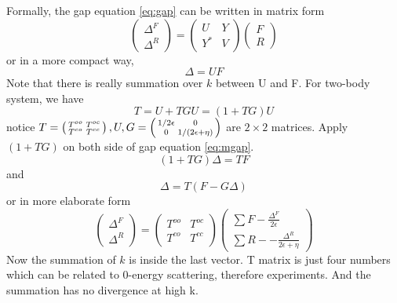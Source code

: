 Formally, the gap equation \eqref{eq:gap} can be written in matrix form
\begin{equation}\label{eq:gapMatrix}
\begin{pmatrix}\Delta^F\\\Delta^R\end{pmatrix}=\begin{pmatrix}U&Y\\Y^*&V\end{pmatrix}\begin{pmatrix}F\\R\end{pmatrix}
\end{equation}
 or in a more compact way, 
\begin{equation}\label{eq:mgap}\Delta=UF\end{equation}
Note that there is really summation over $k$ between U and F.
For two-body system, we have 
\begin{equation}\label{eq:TU}T=U+TGU=(1+TG)U\end{equation}
notice $T=\left(\begin{smallmatrix}T^{oo}&T^{oc}\\T^{co}&T^{cc}\end{smallmatrix}\right),U,G=\left(\begin{smallmatrix}1/2\epsilon&0\\0&1/(2\epsilon+\eta)\end{smallmatrix}\right)$ are $2\times2$ matrices. Apply $(1+TG)$ on both side of gap equation \eqref{eq:mgap}.
\[(1+TG)\Delta=TF\]
and 
\begin{equation}
\Delta=T(F-G\Delta)
\end{equation}
or in more elaborate form
\begin{equation}\label{eq:renomal}
\begin{pmatrix}\Delta^F\\\Delta^R\end{pmatrix}=\begin{pmatrix}T^{oo}&T^{oc}\\T^{co}&T^{cc}\end{pmatrix}
\begin{pmatrix}\sum{F-\frac{\Delta^F}{2\epsilon}}\\\sum{R--\frac{\Delta^R}{2\epsilon+\eta}}\end{pmatrix}
\end{equation}
Now the summation of $k$ is inside the last vector. T matrix is just four numbers which can be related to 0-energy scattering, therefore experiments.   And the summation has no divergence at high k.  

